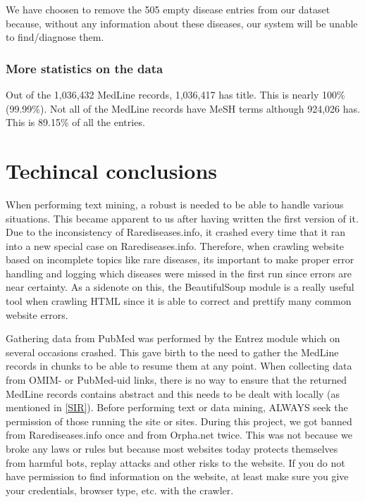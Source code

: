 We have choosen to remove the 505 empty disease entries from our
dataset because, without any information about these diseases, our
system will be unable to find/diagnose them.

\subsubsection{More statistics on the data}
Out of the 1,036,432 MedLine records, 1,036,417 has title. This is
nearly 100\% (99.99\%). Not all of the MedLine records have MeSH terms
although 924,026 has. This is 89.15\% of all the entries. 

\section{Techincal conclusions}

When performing text mining, a robust is needed to be able to handle
various situations. This became apparent to us after having written
the first version of it. Due to the inconsistency of
Rarediseases.info, it crashed every time that it ran into a new
special case on Rarediseases.info. Therefore, when crawling website
based on incomplete topics like rare diseases, its important to make
proper error handling and logging which diseases were missed in the
first run since errors are near certainty. As a sidenote on this, the
BeautifulSoup module is a really useful tool when crawling HTML since
it is able to correct and prettify many common website errors.

Gathering data from PubMed was performed by the Entrez module which on
several occasions crashed. This gave birth to the need to gather the
MedLine records in chunks to be able to resume them at any point. When
collecting data from OMIM- or PubMed-uid links, there is no way to
ensure that the returned MedLine records contains abstract and this
needs to be dealt with locally (as mentioned in \ref{SIR}). Before
performing text or data mining, ALWAYS seek the permission of those
running the site or sites. During this project, we got banned from
Rarediseases.info once and from Orpha.net twice. This was not because
we broke any laws or rules but because most websites today protects
themselves from harmful bots, replay attacks and other risks to the
website. If you do not have permission to find information on the
website, at least make sure you give your credentials, browser type,
etc. with the crawler.

